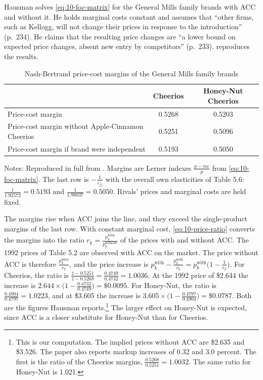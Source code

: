 Hausman solves \eqref{eq:10-foc-matrix} for the General Mills family brands with ACC and without it. He
holds marginal costs constant and assumes that ``other firms, such as Kellogg, will not change their prices
in response to the introduction'' (p.~234). He claims that the resulting price changes are ``a lower bound
on expected price changes, absent new entry by competitors'' (p.~233). 
reproduces the results.

\begin{table}[htbp]
\centering
\caption{Nash-Bertrand price-cost margins of the General Mills family brands}\label{tab:10-hausman-margins}
\begin{threeparttable}
\begin{tabular}{@{}lcc@{}}
\toprule
 & Cheerios & Honey-Nut Cheerios \\
\midrule
Price-cost margin & 0.5268 & 0.5203 \\
Price-cost margin without Apple-Cinnamon Cheerios & 0.5251 & 0.5096 \\
Price-cost margin if brand were independent & 0.5193 & 0.5050 \\
\bottomrule
\end{tabular}
\begin{tablenotes}[flushleft]\footnotesize
\item Notes: Reproduced in full from \citet[Table 5.7]{Hausman1997}. Margins are Lerner indexes
$\frac{p - mc}{p}$ from \eqref{eq:10-foc-matrix}. The last row is $-\frac{1}{\varepsilon_{jj}}$ with the overall
own elasticities of Table 5.6: $\frac{1}{1.92572} = 0.5193$ and $\frac{1}{1.98037} = 0.5050$. Rivals' prices
and marginal costs are held fixed.
\end{tablenotes}
\end{threeparttable}
\end{table}

The margins rise when ACC joins the line, and they exceed the single-product margins of the last row. With
constant marginal cost, \eqref{eq:10-price-ratio} converts the margins into the ratio
$r_k = \frac{p_k^{\text{with}}}{p_k^{\text{without}}}$ of the prices with and without ACC. The 1992 prices of
Table 5.2 are observed with ACC on the market. The price without ACC is therefore $\frac{p_k^{\text{with}}}{r_k}$,
and the price increase is $p_k^{\text{with}} - \frac{p_k^{\text{with}}}{r_k} = p_k^{\text{with}}\bigl(1 - \frac{1}{r_k}\bigr)$.
For Cheerios, the ratio is $\frac{1 - 0.5251}{1 - 0.5268} = \frac{0.4749}{0.4732} = 1.0036$. At the 1992 price of \$2.644
the increase is $2.644 \times \bigl(1 - \frac{0.4732}{0.4749}\bigr) = \$0.0095$. For Honey-Nut, the ratio is
$\frac{0.4904}{0.4797} = 1.0223$, and at \$3.605 the increase is
$3.605 \times \bigl(1 - \frac{0.4797}{0.4904}\bigr) = \$0.0787$. Both are the figures Hausman
reports.\footnote{This is our computation. The implied prices without ACC are \$2.635 and \$3.526. The paper
also reports markup increases of 0.32 and 3.0 percent. The first is the ratio of the Cheerios
margins, $\frac{0.5268}{0.5251} = 1.0032$. The same ratio for Honey-Nut is 1.021.} The larger effect on
Honey-Nut is expected, since ACC is a closer substitute for Honey-Nut than for Cheerios.

